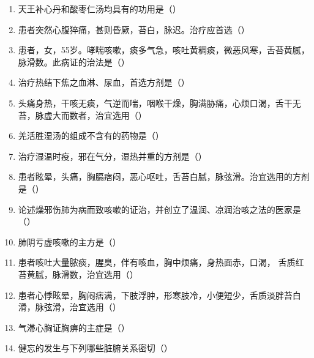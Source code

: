 \documentclass[a4paper,11pt]{ctexart}
\begin{document}
\begin{enumerate}
      \item 天王补心丹和酸枣仁汤均具有的功用是（\quad）
      \item 患者突然心腹猝痛，甚则昏厥，苔白，脉迟。治疗应首选（\quad）
      \item 患者，女，55岁。哮喘咳嗽，痰多气急，咳吐黄稠痰，微恶风寒，舌苔黄腻，脉滑数。此病证的治法是（\quad）
      \item 治疗热结下焦之血淋、尿血，首选方剂是（\quad）
      \item 头痛身热，干咳无痰，气逆而喘，咽喉干燥，胸满胁痛，心烦口渴，舌干无苔，脉虚大而数者，治宜选用（\quad）
      \item 羌活胜湿汤的组成不含有的药物是（\quad）
      \item 治疗湿温时疫，邪在气分，湿热并重的方剂是（\quad）
      \item 患者眩晕，头痛，胸膈痞闷，恶心呕吐，舌苔白腻，脉弦滑。治宜选用的方剂是（\quad）
      \item 论述燥邪伤肺为病而致咳嗽的证治，并创立了温润、凉润治咳之法的医家是（\quad）
      \item 肺阴亏虚咳嗽的主方是（\quad）
      \item 患者咳吐大量脓痰，腥臭，伴有咳血，胸中烦痛，身热面赤，口渴，
            舌质红苔黄腻，脉滑数，治宜选用（\quad）
      \item 患者心悸眩晕，胸闷痞满，下肢浮肿，形寒肢冷，小便短少，舌质淡胖苔白滑，脉弦滑，治宜选用（\quad）
      \item 气滞心胸证胸痹的主症是（\quad）
      \item 健忘的发生与下列哪些脏腑关系密切（\quad）

\end{enumerate}
\end{document}
